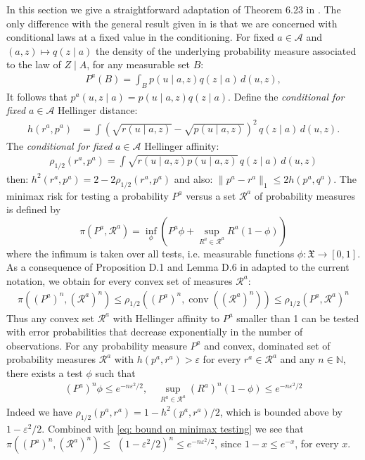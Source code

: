 In this section we give a straightforward adaptation of Theorem 6.23 in \cite{4}. The only difference with the general result given in \cite{4} is that we are concerned with conditional laws at a fixed value in the conditioning. For fixed $a \in \mathcal{A}$ and $(a,z) \mapsto q(z \mid a)$ the density of the underlying probability measure associated to the law of $Z \mid A$, for any measurable set $B$:
\begin{align}
    P^a(B) = \int_B p(u \mid a,z) q(z \mid a) \, d(u,z), 
\end{align}
It follows that $p^a(u,z \mid a) = p(u \mid a,z) q(z \mid a)$. Define the \textit{conditional for fixed} $a \in \mathcal{A}$ Hellinger distance:
\begin{align}
    h(r^a,p^a)&=  \int (\sqrt{r(u \mid a,z)} - \sqrt{p(u \mid a,z)})^2 \, q(z \mid a) \, d(u,z).
\end{align}
The \textit{conditional for fixed} $a \in \mathcal{A}$ Hellinger affinity:
\begin{align}
    \rho_{1/2} (r^a,p^a) = \int \sqrt{r(u \mid a,z)p(u \mid a,z)} \, q(z \mid a) \, d(u,z)
\end{align}
then: $h^2(r^a,p^a) = 2 - 2 \rho_{1/2} (r^a,p^a)$ and also: $\| p^a - r^a \|_1 \leq 2 h(p^a,q^a)$. The minimax risk for testing a probability $P^a$ versus a set $\mathcal{R}^a$ of probability measures is defined by
$$
\pi(P^a, \mathcal{R}^a)=\inf _\phi(P^a \phi+\sup _{R^a \in \mathcal{R}^a} R^a(1-\phi))
$$
where the infimum is taken over all tests, i.e. measurable functions $\phi: \mathfrak{X} \rightarrow[0,1]$. As a consequence of Proposition D.1 and Lemma D.6 in \cite{4} adapted to the current notation, we obtain for every convex set of measures $\mathcal{R}^a$:
\begin{align}\label{eq: bound on minimax testing}
\pi\left((P^a)^n, (\mathcal{R}^a)^n\right) \leq \rho_{1 / 2}\left((P^a)^n, \operatorname{conv}\left((\mathcal{R}^a)^n\right)\right) \leq \rho_{1 / 2}(P^a, \mathcal{R}^a)^n
\end{align}
Thus any convex set $\mathcal{R}^a$ with Hellinger affinity to $P^a$ smaller than 1 can be tested with error probabilities that decrease exponentially in the number of observations.
For any probability measure $P^a$ and convex, dominated set of probability measures $\mathcal{R}^a$ with $h(p^a, r^a)>\varepsilon$ for every $r^a \in \mathcal{R}^a$ and any $n \in \mathbb{N}$, there exists a test $\phi$ such that
\begin{align}\label{eq: exponential bound convex alternatives}
(P^a)^n \phi \leq e^{-n \varepsilon^2 / 2}, \quad \sup _{R^a \in \mathcal{R}^a} (R^a)^n(1-\phi) \leq e^{-n \varepsilon^2 / 2}
\end{align}
Indeed we have $\rho_{1 / 2}(p^a, r^a)=1-h^2(p^a, r^a) / 2$, which is bounded above by $1-\varepsilon^2 / 2$. Combined with \eqref{eq: bound on minimax testing} we see that $\pi\left((P^a)^n, (\mathcal{R}^a)^n\right) \leq$ $\left(1-\varepsilon^2 / 2\right)^n \leq e^{-n \varepsilon^2 / 2}$, since $1-x \leq e^{-x}$, for every $x$.


